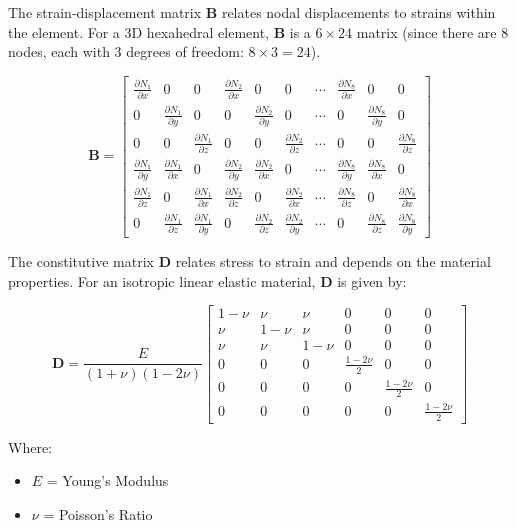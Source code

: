 \documentclass{article}
\begin{document}
The strain-displacement matrix $ \mathbf{B} $ relates nodal displacements to strains within the element. For a 3D hexahedral element, $ \mathbf{B} $ is a $ 6 \times 24 $ matrix (since there are 8 nodes, each with 3 degrees of freedom: $ 8 \times 3 = 24 $).

$$
\mathbf{B} = 
\begin{bmatrix}
\frac{\partial N_1}{\partial x} & 0 & 0 & \frac{\partial N_2}{\partial x} & 0 & 0 & \cdots & \frac{\partial N_8}{\partial x} & 0 & 0 \\
0 & \frac{\partial N_1}{\partial y} & 0 & 0 & \frac{\partial N_2}{\partial y} & 0 & \cdots & 0 & \frac{\partial N_8}{\partial y} & 0 \\
0 & 0 & \frac{\partial N_1}{\partial z} & 0 & 0 & \frac{\partial N_2}{\partial z} & \cdots & 0 & 0 & \frac{\partial N_8}{\partial z} \\
\frac{\partial N_1}{\partial y} & \frac{\partial N_1}{\partial x} & 0 & \frac{\partial N_2}{\partial y} & \frac{\partial N_2}{\partial x} & 0 & \cdots & \frac{\partial N_8}{\partial y} & \frac{\partial N_8}{\partial x} & 0 \\
\frac{\partial N_1}{\partial z} & 0 & \frac{\partial N_1}{\partial x} & \frac{\partial N_2}{\partial z} & 0 & \frac{\partial N_2}{\partial x} & \cdots & \frac{\partial N_8}{\partial z} & 0 & \frac{\partial N_8}{\partial x} \\
0 & \frac{\partial N_1}{\partial z} & \frac{\partial N_1}{\partial y} & 0 & \frac{\partial N_2}{\partial z} & \frac{\partial N_2}{\partial y} & \cdots & 0 & \frac{\partial N_8}{\partial z} & \frac{\partial N_8}{\partial y} 
\end{bmatrix}
$$

The constitutive matrix $ \mathbf{D} $ relates stress to strain and depends on the material properties. For an isotropic linear elastic material, $ \mathbf{D} $ is given by:

$$
\mathbf{D} = \frac{E}{(1+\nu)(1-2\nu)} 
\begin{bmatrix}
1-\nu & \nu & \nu & 0 & 0 & 0 \\
\nu & 1-\nu & \nu & 0 & 0 & 0 \\
\nu & \nu & 1-\nu & 0 & 0 & 0 \\
0 & 0 & 0 & \frac{1-2\nu}{2} & 0 & 0 \\
0 & 0 & 0 & 0 & \frac{1-2\nu}{2} & 0 \\
0 & 0 & 0 & 0 & 0 & \frac{1-2\nu}{2} 
\end{bmatrix}
$$

Where:
\begin{itemize}
    \item $ E $ = Young's Modulus
    \item $ \nu $ = Poisson's Ratio
\end{itemize}
\end{document}
